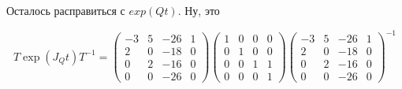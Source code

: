 \documentclass[12pt, a4paper]{article}
\begin{document}
    Осталось расправиться с $exp(Q t)$. Ну, это

    \begin{equation}
        T \exp(J_Q t) T^{-1} = \left(\begin{matrix}
            -3 & 5 & -26 & 1 \\
            2 & 0 & -18 & 0 \\
            0 & 2 & -16 & 0 \\
            0 & 0 & -26 & 0
        \end{matrix}\right) \left(\begin{matrix}
            1 & 0 & 0 & 0 \\
            0 & 1 & 0 & 0 \\
            0 & 0 & 1 & 1 \\
            0 & 0 & 0 & 1
        \end{matrix}\right) \left(\begin{matrix}
            -3 & 5 & -26 & 1 \\
            2 & 0 & -18 & 0 \\
            0 & 2 & -16 & 0 \\
            0 & 0 & -26 & 0
        \end{matrix}\right)^{-1}
    \end{equation}
\end{document}
